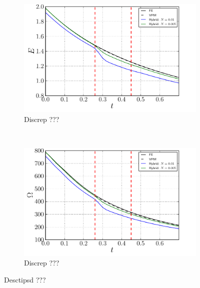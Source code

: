 	\begin{figure}[!t]
     \centering
     \begin{subfigure}[t]{0.48\textwidth}
             \includegraphics[width=\linewidth]{./figures/hybrid/cbConv/hybrid_dipoleConvection_comparison_parameter_E.pdf}
             \caption{Discrep ???}
             \label{fig:hybrid_dipoleConvection_comparison_parameter_E}
     \end{subfigure}     
     ~
     \begin{subfigure}[t]{0.48\textwidth}
             \includegraphics[width=\linewidth]{./figures/hybrid/cbConv/hybrid_dipoleConvection_comparison_parameter_Omega.pdf}
             \caption{Discrep ???}
             \label{fig:hybrid_dipoleConvection_comparison_parameter_Omega}
     \end{subfigure}        
     
     \caption{Desctipsd ???}
     \label{fig:hybrid_dipoleConvection_comparison_parameter}
	\end{figure}

